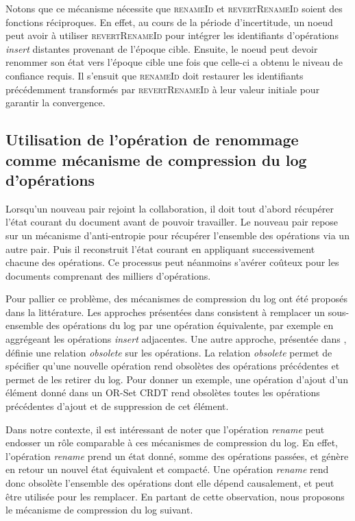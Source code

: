 \documentclass[12pt]{thesul}
\begin{document}
Notons que ce mécanisme nécessite que \textsc{renameId} et \textsc{revertRenameId} soient des fonctions réciproques.
En effet, au cours de la période d'incertitude, un noeud peut avoir à utiliser \textsc{revertRenameId} pour intégrer les identifiants d'opérations \emph{insert} distantes provenant de l'époque cible.
Ensuite, le noeud peut devoir renommer son état vers l'époque cible une fois que celle-ci a obtenu le niveau de confiance requis.
Il s'ensuit que \textsc{renameId} doit restaurer les identifiants précédemment transformés par \textsc{revertRenameId} à leur valeur initiale pour garantir la convergence.

\subsection{Utilisation de l'opération de renommage comme mécanisme de compression du log d'opérations}

\label{sec:rename-as-compression-mechanism}

Lorsqu'un nouveau pair rejoint la collaboration, il doit tout d'abord récupérer l'état courant du document avant de pouvoir travailler.
Le nouveau pair repose sur un mécanisme d'anti-entropie \cite{1983-anti-entropy-vv} pour récupérer l'ensemble des opérations via un autre pair.
Puis il reconstruit l'état courant en appliquant successivement chacune des opérations.
Ce processus peut néanmoins s'avérer coûteux pour les documents comprenant des milliers d'opérations.

Pour pallier ce problème, des mécanismes de compression du log ont été proposés dans la littérature.
Les approches présentées dans \cite{2002-log-compression-op-based-vcs-shen-sun, 2006-these-claudia} consistent à remplacer un sous-ensemble des opérations du log par une opération équivalente, par exemple en aggrégeant les opérations \emph{insert} adjacentes.
Une autre approche, présentée dans \cite{2014-making-op-based-crdts-op-based}, définie une relation \emph{obsolete} sur les opérations.
La relation \emph{obsolete} permet de spécifier qu'une nouvelle opération rend obsolètes des opérations précédentes et permet de les retirer du log.
Pour donner un exemple, une opération d'ajout d'un élément donné dans un OR-Set \ac{CRDT} rend obsolètes toutes les opérations précédentes d'ajout et de suppression de cet élément.

Dans notre contexte, il est intéressant de noter que l'opération \emph{rename} peut endosser un rôle comparable à ces mécanismes de compression du log.
En effet, l'opération \emph{rename} prend un état donné, somme des opérations passées, et génère en retour un nouvel état équivalent et compacté.
Une opération \emph{rename} rend donc obsolète l'ensemble des opérations dont elle dépend causalement, et peut être utilisée pour les remplacer.
En partant de cette observation, nous proposons le mécanisme de compression du log suivant.
\end{document}
